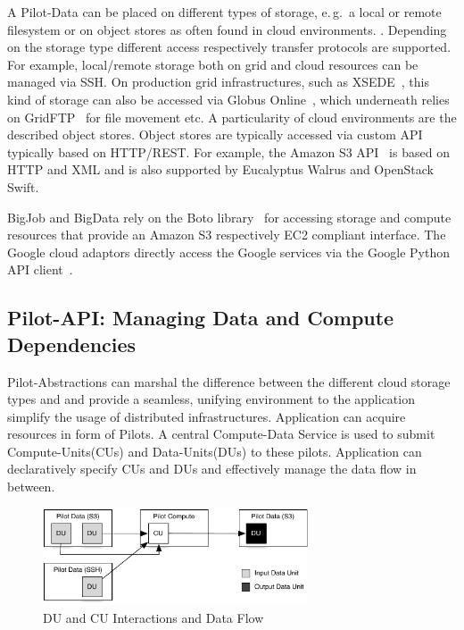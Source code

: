 \documentclass[times]{cpeauth}
\newcommand{\jhanote}[1]{ {\textcolor{red} { ***shantenu: #1 }}}
\newcommand{\jhanote}[1]{}
\newcommand{\pilots}{Pilots\xspace}
\newcommand{\pilotdata}{Pilot-Data\xspace}
\newcommand{\computedataservice}{Compute-Data Service\xspace}
\newcommand{\computeunits}{Compute-Units\xspace}
\newcommand{\dataunits}{Data-Units\xspace}
\newcommand{\dus}{DUs\xspace}
\newcommand{\cus}{CUs\xspace}
\begin{document}
A \pilotdata can be placed on different types of storage, e.\,g.\ a local or
remote filesystem or on object stores as often found in cloud environments. .
Depending on the storage type different access respectively transfer protocols
are supported. For example, local/remote storage both on grid and cloud
resources can be managed via SSH. On production grid infrastructures, such as
XSEDE~\cite{xsede}, this kind of storage can also be accessed via Globus
Online~\cite{10.1109/MIC.2011.64}, which underneath relies on
GridFTP~\cite{ogf-gfd-20} for file movement etc. A particularity of cloud
environments are the described object stores. Object stores are typically
accessed via custom API typically based on HTTP/REST. For example, the Amazon
S3 API~\cite{amazons3api} is based on HTTP and XML and is also supported by
Eucalyptus Walrus and OpenStack Swift.

BigJob and BigData rely on the Boto library~\cite{boto} for accessing storage
and compute resources that provide an Amazon S3 respectively EC2 compliant
interface. The Google cloud adaptors directly access the Google services via
the Google Python API client~\cite{google-api-client}.

 





\subsection{Pilot-API: Managing Data and Compute Dependencies}

Pilot-Abstractions can marshal the difference between the different cloud
storage types and and provide a seamless, unifying environment to the
application simplify the usage of distributed infrastructures. Application can 
acquire resources in form of \pilots. A central \computedataservice is used to 
submit \computeunits (\cus) and \dataunits (\dus) to these pilots. Application 
can declaratively specify \cus and \dus and effectively manage the data flow 
in between. 

\begin{figure}[htbp]
	\centering
		\includegraphics[width=0.7\textwidth]{figures/data-flow.pdf}
	\caption{DU and CU Interactions and Data Flow}
	\label{fig:figures_data-flow}
\end{figure}
\end{document}

